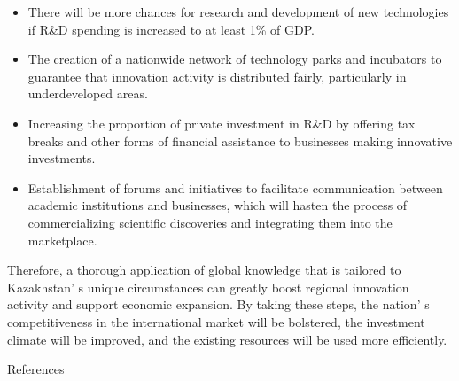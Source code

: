 \begin{itemize}
\item
  There will be more chances for research and development of new
  technologies if R\&D spending is increased to at least 1\% of GDP.
\item
  The creation of a nationwide network of technology parks and
  incubators to guarantee that innovation activity is distributed
  fairly, particularly in underdeveloped areas.
\item
  Increasing the proportion of private investment in R\&D by offering
  tax breaks and other forms of financial assistance to businesses
  making innovative investments.
\item
  Establishment of forums and initiatives to facilitate communication
  between academic institutions and businesses, which will hasten the
  process of commercializing scientific discoveries and integrating them
  into the marketplace.
\end{itemize}

Therefore, a thorough application of global knowledge that is tailored
to Kazakhstan' s unique circumstances can greatly boost
regional innovation activity and support economic expansion. By taking
these steps, the nation' s competitiveness in the
international market will be bolstered, the investment climate will be
improved, and the existing resources will be used more efficiently.

References

